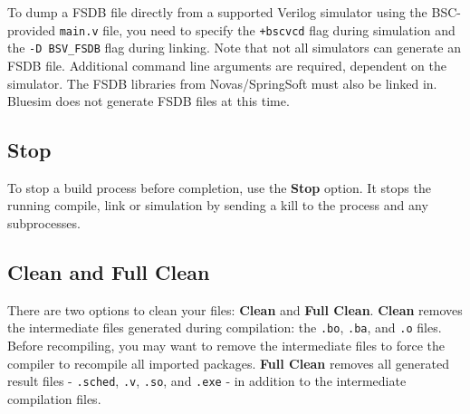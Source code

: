\documentclass{article}
\newcommand{\te}[1]{\texttt{#1}}
\begin{document}
To dump a FSDB file directly from a supported Verilog simulator using
the BSC-provided \te{main.v} file, you  need to specify the
\te{+bscvcd} flag during simulation and the  \te{-D BSV\_FSDB} flag
during linking.   Note
that not all simulators can generate an FSDB file. Additional command
line arguments are required, dependent on the simulator. The FSDB
libraries  from Novas/SpringSoft must also be linked in.
 Bluesim does not
generate FSDB files at this time.





\subsection{Stop}

To stop a build process before completion, use the {\bf Stop} option.  It
stops the running compile, link or simulation by sending a kill to the process
and any subprocesses.


\subsection{Clean and Full Clean}
\label{clean}

There are two
options to clean your files: {\bf Clean} and {\bf Full Clean}.  {\bf
Clean} removes the intermediate files generated during compilation: the
\te{.bo}, \te{.ba}, and \te{.o} files.
Before recompiling, you may want to
remove the intermediate files to force the compiler to recompile
all  imported packages.
{\bf Full Clean} removes all generated result files - \te{.sched},
\te{.v}, \te{.so}, and \te{.exe} -  in addition to
the intermediate compilation files.
\end{document}
